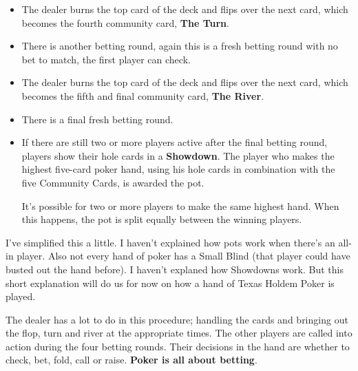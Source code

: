 \begin{itemize}
\item The dealer burns the top card of the deck and flips over the
  next card, which becomes the fourth community card, \textbf{The
    Turn}.

\item There is another betting round, again this is a fresh betting
  round with no bet to match, the first player can check.

\item The dealer burns the top card of the deck and flips over the
  next card, which becomes the fifth and final community card, \textbf{The
    River}.

\item There is a final fresh betting round.

\item If there are still two or more players active after the final
  betting round, players show their hole cards in a \textbf{Showdown}.
  The player who makes the highest five-card poker hand, using his
  hole cards in combination with the five Community Cards, is awarded
  the pot.

  It's possible for two or more players to make the same highest
  hand. When this happens, the pot is split equally between the
  winning players.

\end{itemize}

I've simplified this a little. I haven't explained how pots work when
there's an all-in player. Also not every hand of poker has a Small Blind
(that player could have busted out the hand before). I haven't
explaned how Showdowns work. But this short explanation will do us for
now on how a hand of Texas Holdem Poker is played.

The dealer has a lot to do in this procedure; handling the cards and
bringing out the flop, turn and river at the appropriate times. The
other players are called into action during the four betting
rounds. Their decisions in the hand are whether to check, bet, fold,
call or raise. \textbf{Poker is all about betting}.

